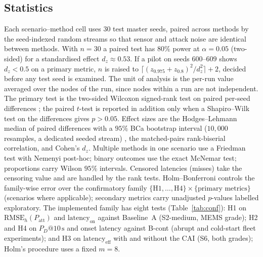 \documentclass[journal]{IEEEtran}
\begin{document}
\subsection{Statistics}
\label{sec:stats}
Each scenario--method cell uses $30$ test master seeds, paired across methods by the seed-indexed random
streams so that sensor and attack noise are identical between methods. With $n = 30$ a paired test has
$80\%$ power at $\alpha = 0.05$ (two-sided) for a standardised effect $d_z \approx 0.53$. If a pilot on
seeds $600$--$609$ shows $d_z < 0.5$ on a primary metric, $n$ is raised to
$\lceil (z_{0.975}+z_{0.8})^2/d_z^2\rceil + 2$, decided before any test seed is examined. The unit of analysis
is the per-run value averaged over the nodes of the run, since nodes within a run are not independent.
The primary test is the two-sided Wilcoxon signed-rank test on paired per-seed differences
\cite{wilcoxon1945individual}; the paired $t$-test is reported in addition only when a Shapiro--Wilk test on the
differences gives $p > 0.05$. Effect sizes are the Hodges--Lehmann median of paired differences
\cite{hodges1963estimates} with a $95\%$ BCa bootstrap interval ($10{,}000$ resamples, a dedicated
seeded stream) \cite{efron1987better}, the matched-pairs rank-biserial correlation, and Cohen's $d_z$.
Multiple methods in one scenario use a Friedman test with Nemenyi post-hoc; binary
outcomes use the exact McNemar test; proportions carry Wilson $95\%$ intervals. Censored latencies (misses)
take the censoring value and are handled by the rank tests. Holm--Bonferroni \cite{holm1979simple}
controls the family-wise error over the confirmatory family $\{\mathrm{H1},\ldots,\mathrm{H4}\}\times\{\text{primary
metrics}\}$ (scenarios where applicable); secondary metrics carry unadjusted $p$-values labelled
exploratory. The implemented family has eight tests (Table~\ref{tab:conf}): H1 on $\mathrm{RMSE}_h(P_{\mathrm{att}})$ and
$\mathrm{latency}_{\mathrm{on}}$ against Baseline~A (S2-medium, MEMS grade); H2 and H4 on $P_D@10\,\mathrm{s}$ and onset latency
against B-cont (abrupt and cold-start fleet experiments); and H3 on $\mathrm{latency}_{\mathrm{eff}}$ with and without the CAI (S6, both grades); Holm's procedure uses a fixed $m=8$.

\end{document}

